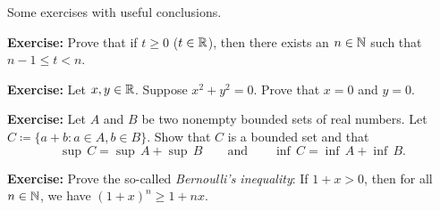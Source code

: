 \documentclass[10pt,aspectratio=149]{beamer}
\begin{document}
\begin{frame}
Some exercises with useful conclusions.

\medskip
\pause

\textbf{Exercise:}
Prove that
if $t \geq 0$ ($t \in {\mathbb{R}}$), then there exists an $n \in {\mathbb{N}}$ such that $n-1 \leq t < n$.

\medskip
\pause

\textbf{Exercise:}
Let $x, y \in {\mathbb{R}}$.  Suppose $x^2 + y^2 = 0$.  Prove that 
$x = 0$ and $y = 0$.

\medskip
\pause

\textbf{Exercise:}
Let $A$ and $B$ be two nonempty bounded sets of real numbers.  Let
$C \coloneqq \{ a+b : a \in A, b \in B \}$.
Show that $C$ is a bounded set and that
\begin{equation*}
\sup\,C = \sup\,A + \sup\,B 
\qquad \text{and} \qquad
\inf\,C = \inf\,A + \inf\,B .
\end{equation*}

%

\medskip
\pause

\textbf{Exercise:}
Prove the so-called \emph{Bernoulli's inequality}: If $1+x > 0$, then
for all $n \in {\mathbb{N}}$, we have $(1+x)^n \geq 1+nx$.

\end{frame}
\end{document}

